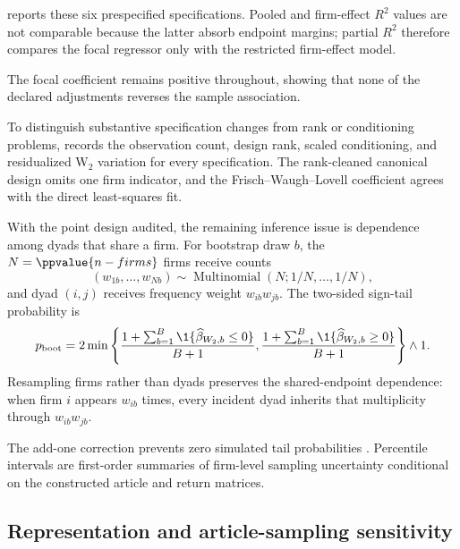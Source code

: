  reports these six prespecified specifications.
Pooled and firm-effect $R^2$ values are not comparable because the latter
absorb endpoint margins; partial $R^2$ therefore compares the focal regressor
only with the restricted firm-effect model.



The focal coefficient remains positive throughout, showing that none of the
declared adjustments reverses the sample association.

To distinguish substantive specification changes from rank or conditioning
problems,  records the observation count,
design rank, scaled conditioning, and residualized W$_2$ variation for every
specification.
The rank-cleaned canonical design omits one firm indicator, and the
Frisch--Waugh--Lovell coefficient agrees with the direct least-squares fit.



With the point design audited, the remaining inference issue is dependence
among dyads that share a firm.
For bootstrap draw $b$, the $N=\ppvalue{n-firms}$ firms receive counts
\begin{equation}\label{eq:node-bootstrap-counts}
  (w_{1b},\ldots,w_{Nb})
  \sim\operatorname{Multinomial}(N;1/N,\ldots,1/N),
\end{equation}
and dyad $(i,j)$ receives frequency weight $w_{ib}w_{jb}$. The two-sided
sign-tail probability is
\begin{equation}\label{eq:dyadic-bootstrap-tail}
  p_{\mathrm{boot}}
  =2\min\left\{
    \frac{1+\sum_{b=1}^{B}\1\{\widehat\beta_{W_2,b}\leq0\}}{B+1},
    \frac{1+\sum_{b=1}^{B}\1\{\widehat\beta_{W_2,b}\geq0\}}{B+1}
  \right\}\wedge1.
\end{equation}
Resampling firms rather than dyads preserves the shared-endpoint dependence:
when firm $i$ appears $w_{ib}$ times, every incident dyad inherits that
multiplicity through $w_{ib}w_{jb}$.

The add-one correction prevents zero simulated tail probabilities
\citep{phipson2010permutation}. Percentile intervals are first-order summaries
of firm-level sampling uncertainty conditional on the constructed article
and return matrices.

\subsection{Representation and article-sampling sensitivity}
\label{sec:representation-diagnostics}
\label{sec:wasserstein-sensitivity}
\label{sec:xmodel-robustness}
\label{sec:geometry-diagnostics}

